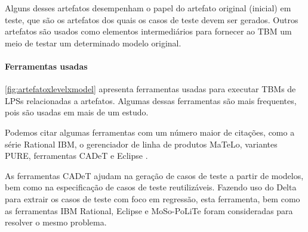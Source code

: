 Alguns desses artefatos desempenham o papel do artefato original (inicial) em teste, que são os artefatos dos quais os casos de teste devem ser gerados. Outros artefatos são usados como elementos intermediários para fornecer ao TBM um meio de testar um determinado modelo original.


\paragraph{\textbf{Ferramentas usadas}}

\ref{fig:artefatoxlevelxmodel} apresenta ferramentas usadas para executar TBMs de LPSs relacionadas a artefatos. Algumas dessas ferramentas são mais frequentes, pois são usadas em mais de um estudo.

Podemos citar algumas ferramentas com um número maior de citações, como a série Rational IBM, o gerenciador de linha de produtos MaTeLo, variantes PURE, ferramentas CADeT e Eclipse \cite{olimpiew2005model, samih2014mplm, Lity_et_al2012, beohar2014spinal, costa2016split}.

As ferramentas CADeT \cite{olimpiew2005model} ajudam na geração de casos de teste a partir de modelos, bem como na especificação de casos de teste reutilizáveis. Fazendo uso do Delta para extrair os casos de teste com foco em regressão, esta ferramenta, bem como as ferramentas IBM Rational, Eclipse \cite{lochau2012incremental} e MoSo-PoLiTe foram consideradas para resolver o mesmo problema.


